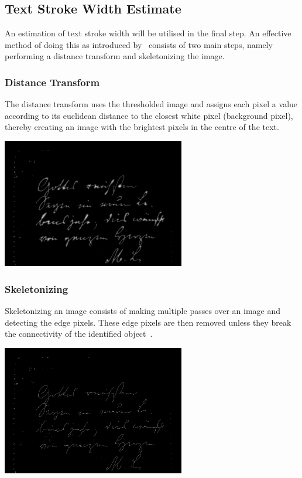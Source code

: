 \documentclass[a4paper, 12pt]{report}
\begin{document}
\subsection{Text Stroke Width Estimate}
An estimation of text stroke width will be utilised in the final step. An effective method of doing this as introduced by~\cite{strokewidth} consists of two main steps, namely performing a distance transform and skeletonizing the image.

\subsubsection{Distance Transform}
The distance transform uses the thresholded image and assigns each pixel a value according to its euclidean distance to the closest white pixel (background pixel), thereby creating an image with the brightest pixels in the centre of the text.

\noindent
\begin{minipage}{\linewidth}
    \centering
    \includegraphics[width=8cm]{distance transform.png}
    \label{fig:5}
\end{minipage}

\subsubsection{Skeletonizing}
Skeletonizing an image consists of making multiple passes over an image and detecting the edge pixels. These edge pixels are then removed unless they break the connectivity of the identified object~\cite{scikit-image}.

\noindent
\begin{minipage}{\linewidth}
    \centering
    \includegraphics[width=8cm]{skeletonized.png}
    \label{fig:6}
\end{minipage}
\end{document}
